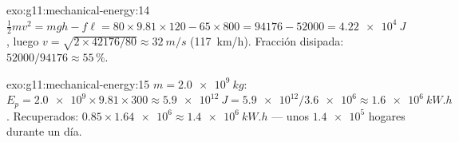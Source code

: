 \begin{solution}{exo:g11:mechanical-energy:14}
$\tfrac12 mv^2 = mgh - f\ell = 80 \times 9.81 \times 120 - 65 \times
800 = \num{94176} - \num{52000} = \qty{4.22e4}{J}$, luego
$v = \sqrt{2 \times \num{42176}/80} \approx \qty{32}{m/s}$
(\qty{117}{km/h}). Fracción disipada:
$52000/94176 \approx 55\,\%$.
\end{solution}

\begin{solution}{exo:g11:mechanical-energy:15}
$m = \qty{2.0e9}{kg}$:
$E_p = \num{2.0e9} \times 9.81 \times 300 \approx \qty{5.9e12}{J}
= \num{5.9e12}/\num{3.6e6} \approx \qty{1.6e6}{kW.h}$. Recuperados:
$0.85 \times \num{1.64e6} \approx \qty{1.4e6}{kW.h}$ --- unos
$\num{1.4e5}$ hogares durante un día.
\end{solution}

